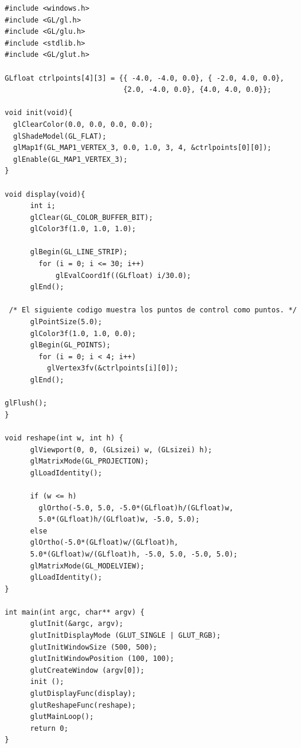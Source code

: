 \lstset{language=C, breaklines=true, basicstyle=\footnotesize}
\begin{lstlisting}
#include <windows.h>
#include <GL/gl.h>
#include <GL/glu.h>
#include <stdlib.h>
#include <GL/glut.h>

GLfloat ctrlpoints[4][3] = {{ -4.0, -4.0, 0.0}, { -2.0, 4.0, 0.0},
                            {2.0, -4.0, 0.0}, {4.0, 4.0, 0.0}};

void init(void){
  glClearColor(0.0, 0.0, 0.0, 0.0);
  glShadeModel(GL_FLAT);
  glMap1f(GL_MAP1_VERTEX_3, 0.0, 1.0, 3, 4, &ctrlpoints[0][0]);
  glEnable(GL_MAP1_VERTEX_3);
}

void display(void){
      int i;
      glClear(GL_COLOR_BUFFER_BIT);
      glColor3f(1.0, 1.0, 1.0);

      glBegin(GL_LINE_STRIP);
        for (i = 0; i <= 30; i++)
            glEvalCoord1f((GLfloat) i/30.0);
      glEnd();

 /* El siguiente codigo muestra los puntos de control como puntos. */
      glPointSize(5.0);
      glColor3f(1.0, 1.0, 0.0);
      glBegin(GL_POINTS);
        for (i = 0; i < 4; i++)
          glVertex3fv(&ctrlpoints[i][0]);
      glEnd();

glFlush();
}

void reshape(int w, int h) {
      glViewport(0, 0, (GLsizei) w, (GLsizei) h);
      glMatrixMode(GL_PROJECTION);
      glLoadIdentity();

      if (w <= h)
        glOrtho(-5.0, 5.0, -5.0*(GLfloat)h/(GLfloat)w,
        5.0*(GLfloat)h/(GLfloat)w, -5.0, 5.0);
      else
      glOrtho(-5.0*(GLfloat)w/(GLfloat)h,
      5.0*(GLfloat)w/(GLfloat)h, -5.0, 5.0, -5.0, 5.0);
      glMatrixMode(GL_MODELVIEW);
      glLoadIdentity();
}

int main(int argc, char** argv) {
      glutInit(&argc, argv);
      glutInitDisplayMode (GLUT_SINGLE | GLUT_RGB);
      glutInitWindowSize (500, 500);
      glutInitWindowPosition (100, 100);
      glutCreateWindow (argv[0]);
      init ();
      glutDisplayFunc(display);
      glutReshapeFunc(reshape);
      glutMainLoop();
      return 0;
}
\end{lstlisting}

